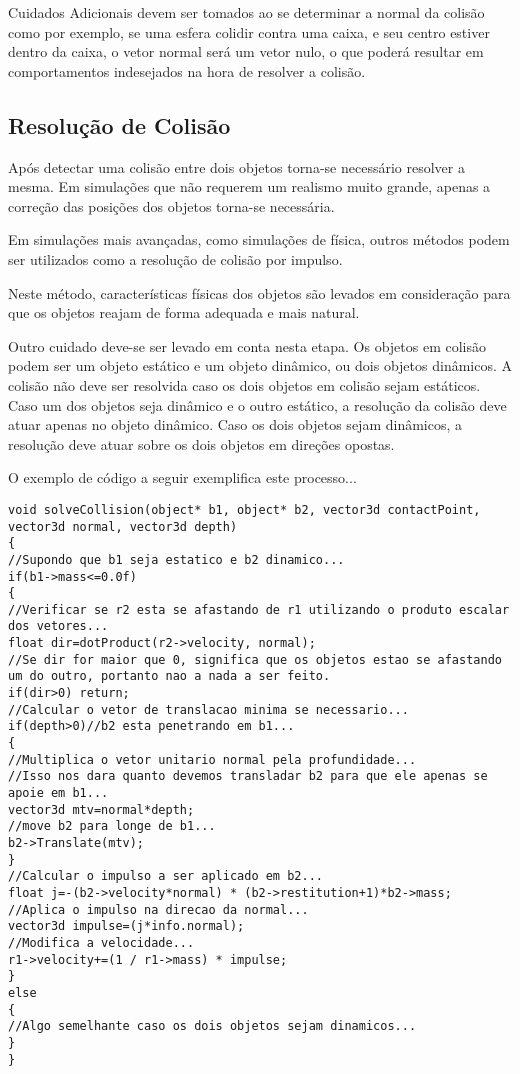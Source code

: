 Cuidados Adicionais devem ser tomados ao se determinar a normal da colisão como
por exemplo, se uma esfera colidir contra uma caixa, e seu centro estiver
dentro da caixa, o vetor normal será um vetor nulo, o que poderá resultar em
comportamentos indesejados na hora de resolver a colisão.

\subsection{Resolução de Colisão}

Após detectar uma colisão entre dois objetos torna-se necessário resolver
a mesma. Em simulações que não requerem um realismo muito grande, apenas a
correção das posições dos objetos torna-se necessária.

Em simulações mais avançadas, como simulações de física, outros métodos podem
ser utilizados como a resolução de colisão por impulso.

Neste método, características físicas dos objetos são levados em consideração
para que os objetos reajam de forma adequada e mais natural.

Outro cuidado deve-se ser levado em conta nesta etapa.
Os objetos em colisão podem ser um objeto estático e um objeto dinâmico, ou
dois objetos dinâmicos. A colisão não deve ser resolvida caso os dois objetos
em colisão sejam estáticos.
Caso um dos objetos seja dinâmico e o outro estático, a resolução da colisão
deve atuar apenas no objeto dinâmico.
Caso os dois objetos sejam dinâmicos, a resolução deve atuar sobre os dois
objetos em direções opostas.

O exemplo de código a seguir exemplifica este processo...


\begin{lstlisting}[frame=single,caption=Exemplo de resolução de colisão\label{code:solveCollision}]
void solveCollision(object* b1, object* b2, vector3d contactPoint, vector3d normal, vector3d depth)
{
//Supondo que b1 seja estatico e b2 dinamico...
if(b1->mass<=0.0f)
{
//Verificar se r2 esta se afastando de r1 utilizando o produto escalar dos vetores...
float dir=dotProduct(r2->velocity, normal);
//Se dir for maior que 0, significa que os objetos estao se afastando um do outro, portanto nao a nada a ser feito.
if(dir>0) return;
//Calcular o vetor de translacao minima se necessario...
if(depth>0)//b2 esta penetrando em b1...
{
//Multiplica o vetor unitario normal pela profundidade...
//Isso nos dara quanto devemos transladar b2 para que ele apenas se apoie em b1...
vector3d mtv=normal*depth;
//move b2 para longe de b1...
b2->Translate(mtv);
}
//Calcular o impulso a ser aplicado em b2...
float j=-(b2->velocity*normal) * (b2->restitution+1)*b2->mass;
//Aplica o impulso na direcao da normal...
vector3d impulse=(j*info.normal);
//Modifica a velocidade...
r1->velocity+=(1 / r1->mass) * impulse;
}
else
{
//Algo semelhante caso os dois objetos sejam dinamicos...
}
}
\end{lstlisting}

